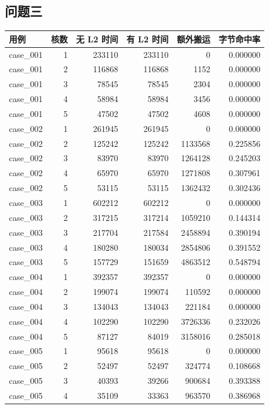 \subsection*{问题三}
\begin{longtable}{lrrrrr}
用例 & 核数 & 无 L2 时间 & 有 L2 时间 & 额外搬运 & 字节命中率 \\ \hline
\endhead
case\_001 & 1 & 233110 & 233110 & 0 & 0.000000 \\
case\_001 & 2 & 116868 & 116868 & 1152 & 0.000000 \\
case\_001 & 3 & 78545 & 78545 & 2304 & 0.000000 \\
case\_001 & 4 & 58984 & 58984 & 3456 & 0.000000 \\
case\_001 & 5 & 47502 & 47502 & 4608 & 0.000000 \\
case\_002 & 1 & 261945 & 261945 & 0 & 0.000000 \\
case\_002 & 2 & 125242 & 125242 & 1133568 & 0.225856 \\
case\_002 & 3 & 83970 & 83970 & 1264128 & 0.245203 \\
case\_002 & 4 & 65970 & 65970 & 1271808 & 0.307961 \\
case\_002 & 5 & 53115 & 53115 & 1362432 & 0.302436 \\
case\_003 & 1 & 602212 & 602212 & 0 & 0.000000 \\
case\_003 & 2 & 317215 & 317214 & 1059210 & 0.144314 \\
case\_003 & 3 & 217704 & 217584 & 2458894 & 0.390194 \\
case\_003 & 4 & 180280 & 180034 & 2854806 & 0.391552 \\
case\_003 & 5 & 157729 & 151659 & 4863512 & 0.548794 \\
case\_004 & 1 & 392357 & 392357 & 0 & 0.000000 \\
case\_004 & 2 & 199074 & 199074 & 110592 & 0.000000 \\
case\_004 & 3 & 134043 & 134043 & 221184 & 0.000000 \\
case\_004 & 4 & 102290 & 102290 & 3726336 & 0.232026 \\
case\_004 & 5 & 87127 & 84019 & 3158016 & 0.285018 \\
case\_005 & 1 & 95618 & 95618 & 0 & 0.000000 \\
case\_005 & 2 & 52497 & 52497 & 324774 & 0.108668 \\
case\_005 & 3 & 40393 & 39266 & 900684 & 0.393388 \\
case\_005 & 4 & 35109 & 33363 & 963570 & 0.386968 \\

\end{longtable}
